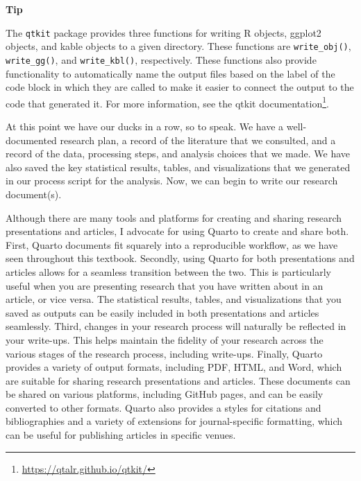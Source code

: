 \documentclass[
  letterpaper,
]{latex/krantz}
\theoremstyle{definition}
\theoremstyle{remark}
\DeclareRobustCommand{\href}[2]{#2\footnote{\url{#1}}}
\begin{document}
\begin{tcolorbox}[enhanced jigsaw, breakable, leftrule=.75mm, arc=.35mm, colframe=quarto-callout-color-frame, colback=white, left=2mm, bottomrule=.15mm, rightrule=.15mm, toprule=.15mm, opacityback=0]

\textbf{ Tip}

The \texttt{qtkit} package provides three functions for writing R
objects, ggplot2 objects, and kable objects to a given directory. These
functions are \texttt{write\_obj()}, \texttt{write\_gg()}, and
\texttt{write\_kbl()}, respectively. These functions also provide
functionality to automatically name the output files based on the label
of the code block in which they are called to make it easier to connect
the output to the code that generated it. For more information, see the
\href{https://qtalr.github.io/qtkit/}{qtkit documentation}.

\end{tcolorbox}

At this point we have our ducks in a row, so to speak. We have a
well-documented research plan, a record of the literature that we
consulted, and a record of the data, processing steps, and analysis
choices that we made. We have also saved the key statistical results,
tables, and visualizations that we generated in our process script for
the analysis. Now, we can begin to write our research document(s).

Although there are many tools and platforms for creating and sharing
research presentations and articles, I advocate for using Quarto to
create and share both. First, Quarto documents fit squarely into a
reproducible workflow, as we have seen throughout this textbook.
Secondly, using Quarto for both presentations and articles allows for a
seamless transition between the two. This is particularly useful when
you are presenting research that you have written about in an article,
or vice versa. The statistical results, tables, and visualizations that
you saved as outputs can be easily included in both presentations and
articles seamlessly. Third, changes in your research process will
naturally be reflected in your write-ups. This helps maintain the
fidelity of your research across the various stages of the research
process, including write-ups. Finally, Quarto provides a variety of
output formats, including PDF, HTML, and Word, which are suitable for
sharing research presentations and articles. These documents can be
shared on various platforms, including GitHub pages, and can be easily
converted to other formats. Quarto also provides a styles for citations
and bibliographies and a variety of extensions for journal-specific
formatting, which can be useful for publishing articles in specific
venues.
\end{document}
